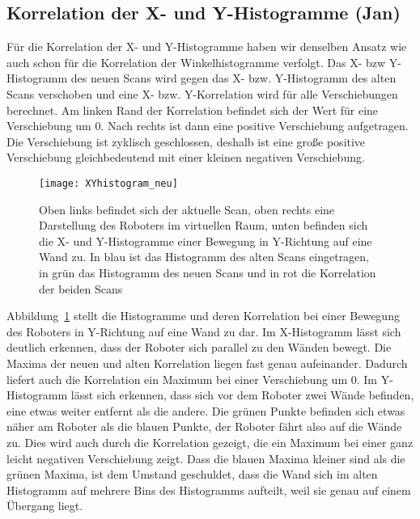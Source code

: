 \subsection{Korrelation der X- und Y-Histogramme (Jan)}

Für die Korrelation der X- und Y-Histogramme haben wir denselben Ansatz wie auch schon für die Korrelation der Winkelhistogramme verfolgt. Das X- bzw Y-Histogramm des neuen Scans wird gegen das X- bzw. Y-Histogramm des alten Scans verschoben und eine X- bzw. Y-Korrelation wird für alle Verschiebungen berechnet. Am linken Rand der Korrelation befindet sich der Wert für eine Verschiebung um 0. Nach rechts ist dann eine positive Verschiebung aufgetragen. Die Verschiebung ist zyklisch geschlossen, deshalb ist eine große positive Verschiebung gleichbedeutend mit einer kleinen negativen Verschiebung.

\begin{figure}
	\centering
	\texttt{[image: XYhistogram\_neu]}
	\caption{Oben links befindet sich der aktuelle Scan, oben rechts eine Darstellung des Roboters im virtuellen Raum, unten befinden sich die X- und Y-Histogramme einer Bewegung in Y-Richtung auf eine Wand zu. In blau ist das Histogramm des alten Scans eingetragen, in grün das Histogramm des neuen Scans und in rot die Korrelation der beiden Scans}
	\label{fig:xyhistogram}
\end{figure}

Abbildung~\ref{fig:xyhistogram} stellt die Histogramme und deren Korrelation bei einer Bewegung des Roboters in Y-Richtung auf eine Wand zu dar. Im X-Histogramm lässt sich deutlich erkennen, dass der Roboter sich parallel zu den Wänden bewegt. Die Maxima der neuen und alten Korrelation liegen fast genau aufeinander. Dadurch liefert auch die Korrelation ein Maximum bei einer Verschiebung um 0. Im Y-Histogramm lässt sich erkennen, dass sich vor dem Roboter zwei Wände befinden, eine etwas weiter entfernt als die andere. Die grünen Punkte befinden sich etwas näher am Roboter als die blauen Punkte, der Roboter fährt also auf die Wände zu. Dies wird auch durch die Korrelation gezeigt, die ein Maximum bei einer ganz leicht negativen Verschiebung zeigt. Dass die blauen Maxima kleiner sind als die grünen Maxima, ist dem Umstand geschuldet, dass die Wand sich im alten Histogramm auf mehrere Bins des Histogramms aufteilt, weil sie genau auf einem Übergang liegt.